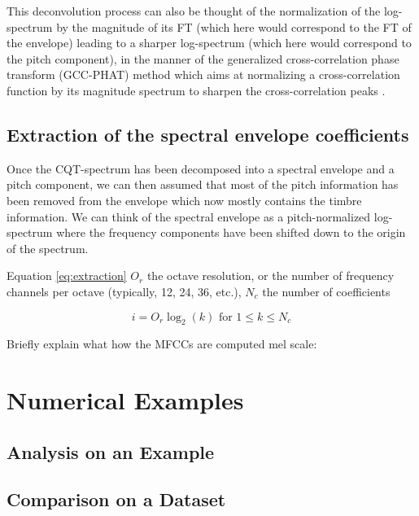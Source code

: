 \documentclass[journal]{IEEEtran}
\begin{document}
This deconvolution process can also be thought of the normalization of the log-spectrum by the magnitude of its FT (which here would correspond to the FT of the envelope) leading to a sharper log-spectrum (which here would correspond to the pitch component), in the manner of the generalized cross-correlation phase transform (GCC-PHAT) method which aims at normalizing a cross-correlation function by its magnitude spectrum to sharpen the cross-correlation peaks \cite{knapp1976}.


\subsection{Extraction of the spectral envelope coefficients}

Once the CQT-spectrum has been decomposed into a spectral envelope and a pitch component, we can then assumed that most of the pitch information has been removed from the envelope which now mostly contains the timbre information. We can think of the spectral envelope as a pitch-normalized log-spectrum where the frequency components have been shifted down to the origin of the spectrum.

Equation \ref{eq:extraction} $O_r$ the octave resolution, or the number of frequency channels per octave (typically, 12, 24, 36, etc.), $N_c$ the number of coefficients

\begin{equation}
\label{eq:extraction}
i = O_r \log_2(k) \text{ for } 1 \le k \le N_c
\end{equation}

Briefly explain what how the MFCCs are computed \cite{mermelstein1976}
mel scale: \cite{stevens1937}



\section{Numerical Examples} %

\subsection{Analysis on an Example}



\subsection{Comparison on a Dataset}
\end{document}
